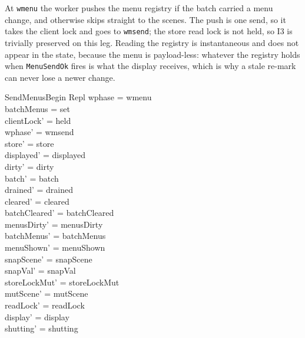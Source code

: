 \documentclass[a4paper,10pt,fleqn]{article}
\begin{document}
At \texttt{wmenu} the worker pushes the menu registry if the batch carried a
menu change, and otherwise skips straight to the scenes.  The push is one
send, so it takes the client lock and goes to \texttt{wmsend}; the store read
lock is not held, so I3 is trivially preserved on this leg.  Reading the
registry is instantaneous and does not appear in the state, because the menu
is payload-less: whatever the registry holds when \texttt{MenuSendOk} fires is
what the display receives, which is why a stale re-mark can never lose a
newer change.

\begin{schema}{SendMenusBegin}
  \Delta Repl
\where
  wphase = wmenu \\
  batchMenus = set \\
  clientLock' = held \\
  wphase' = wmsend \\
  store' = store \\
  displayed' = displayed \\
  dirty' = dirty \\
  batch' = batch \\
  drained' = drained \\
  cleared' = cleared \\
  batchCleared' = batchCleared \\
  menusDirty' = menusDirty \\
  batchMenus' = batchMenus \\
  menuShown' = menuShown \\
  snapScene' = snapScene \\
  snapVal' = snapVal \\
  storeLockMut' = storeLockMut \\
  mutScene' = mutScene \\
  readLock' = readLock \\
  display' = display \\
  shutting' = shutting
\end{schema}
\end{document}
